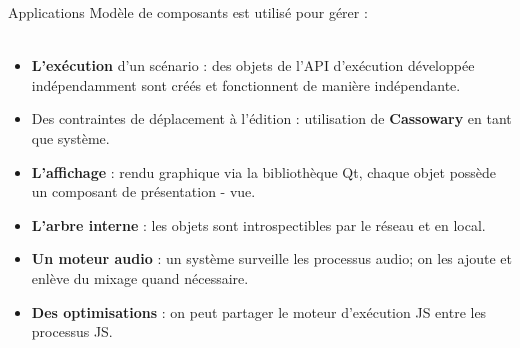 \begin{block}{Applications}
    Modèle de composants est utilisé pour gérer :~\\~\\
    \begin{itemize}
        \item \textbf{L'exécution} d'un scénario : des objets de l'API d'exécution développée indépendamment sont créés et fonctionnent de manière indépendante.
        \item Des contraintes de déplacement à l'édition : utilisation de \textbf{Cassowary} en tant que système.
        \item \textbf{L'affichage} : rendu graphique via la bibliothèque Qt, chaque objet possède un composant de présentation - vue.
        \item \textbf{L'arbre interne} : les objets sont introspectibles par le réseau et en local.
        \item \textbf{Un moteur audio} : un système surveille les processus audio; on les ajoute et enlève du mixage quand nécessaire.
        \item \textbf{Des optimisations} : on peut partager le moteur d'exécution JS entre les processus JS.
    \end{itemize}
\end{block}